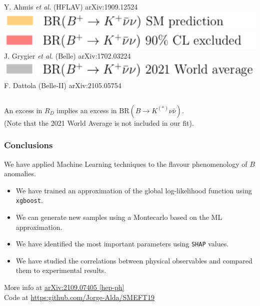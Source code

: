 \documentclass[mathserif, 10pt, dvipsnames]{beamer}
\newcommand\colorcite[1]{{\scriptsize\color{blue}#1}}
\begin{document}
\begin{frame}
\begin{center}
\begin{columns}[onlytextwidth]
\begin{column}{0.45\textwidth}
                \colorcite{Y. Ahmis \textit{et al.} (HFLAV) arXiv:1909.12524}\\[4pt]
                \includegraphics[width=\textwidth]{figures/RD_BKnunu_leg4.pdf}\\[2pt]
                \includegraphics[width=\textwidth]{figures/RD_BKnunu_leg5.pdf}\\[-6pt]
                \colorcite{J. Grygier \textit{et al.} (Belle) arXiv:1702.03224}\\[4pt]
                \includegraphics[width=\textwidth]{figures/RD_BKnunu_leg6.pdf}\\[-6pt]
                \colorcite{F. Dattola (Belle-II) arXiv:2105.05754}
            \end{column}
        \end{columns}

    \end{center}

    An excess in $R_D$ implies an excess in $\mathrm{BR}(B\to K^{(*)}\nu\bar{\nu})$. \\(Note that the {\color{gray}2021 World Average} is not included in our fit).

\end{frame}

\begin{frame}\frametitle{Conclusions}
    We have applied Machine Learning techniques to the flavour phenomenology of $B$ anomalies.
    \begin{itemize}
        \item We have trained an approximation of the global log-likelihood function using \texttt{xgboost}.
        \item We can generate new samples using a Montecarlo based on the ML approximation.
        \item We have identified the most important parameters using \texttt{SHAP} values.
        \item We have studied the correlations between physical observables and compared them to experimental results.
    \end{itemize}

    \vspace{0.5cm}
    \begin{center}
More info at \hyperlink{https://arxiv.org/abs/2109.07405}{arXiv:2109.07405 [hep-ph]}\\
Code at \url{https:github.com/Jorge-Alda/SMEFT19}
    \end{center}
\end{frame}
\end{document}
